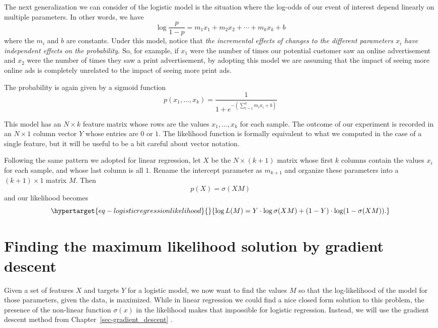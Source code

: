 \documentclass[
  11pt,
  letterpaper,
]{scrbook}
\theoremstyle{plain}
\theoremstyle{remark}
\begin{document}
The next generalization we can consider of the logistic model is the
situation where the log-odds of our event of interest depend linearly on
multiple parameters. In other words, we have \[
\log\frac{p}{1-p} = m_1 x_1 + m_2 x_2 + \cdots + m_k x_k + b 
\] where the \(m_i\) and \(b\) are constants. Under this model, notice
that \emph{the incremental effects of changes to the different
parameters \(x_i\) have independent effects on the probability.} So, for
example, if \(x_1\) were the number of times our potential customer saw
an online advertisement and \(x_2\) were the number of times they saw a
print advertisement, by adopting this model we are assuming that the
impact of seeing more online ads is completely unrelated to the impact
of seeing more print ads.

The probability is again given by a sigmoid function \[
p(x_1,\ldots, x_{k}) = \frac{1}{1+e^{-(\sum_{i=1}^{k} m_i x_i + b)}}
\]

This model has an \(N\times k\) feature matrix whose rows are the values
\(x_1,\ldots, x_{k}\) for each sample. The outcome of our experiment is
recorded in an \(N\times 1\) column vector \(Y\) whose entries are \(0\)
or \(1\). The likelihood function is formally equivalent to what we
computed in the case of a single feature, but it will be useful to be a
bit careful about vector notation.

Following the same pattern we adopted for linear regression, let \(X\)
be the \(N\times (k+1)\) matrix whose first \(k\) columns contain the
values \(x_i\) for each sample, and whose last column is all \(1\).
Rename the intercept parameter as \(m_{k+1}\) and organize these
parameters into a \((k+1)\times 1\) matrix \(M\). Then \[
p(X)=\sigma(XM)
\] and our likelihood becomes
\begin{equation}\protect\hypertarget{eq-logisticregressionlikelihood}{}{
\log L(M) = Y\cdot \log\sigma(XM) + (1-Y)\cdot\log(1-\sigma(XM)).
}\label{eq-logisticregressionlikelihood}\end{equation}

\hypertarget{finding-the-maximum-likelihood-solution-by-gradient-descent}{%
\section{Finding the maximum likelihood solution by gradient
descent}\label{finding-the-maximum-likelihood-solution-by-gradient-descent}}

Given a set of features \(X\) and targets \(Y\) for a logistic model, we
now want to find the values \(M\) so that the log-likelihood of the
model for those parameters, given the data, is maximized. While in
linear regression we could find a nice closed form solution to this
problem, the presence of the non-linear function \(\sigma(x)\) in the
likelihood makes that impossible for logistic regression. Instead, we
will use the gradient descent method from
Chapter~\ref{sec-gradient_descent} .
\end{document}
